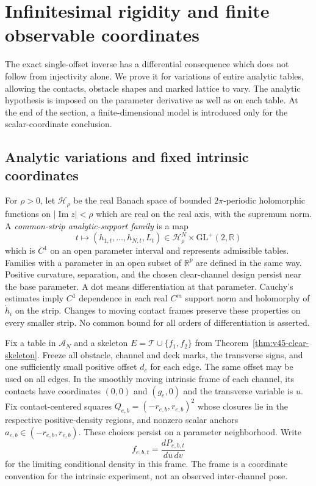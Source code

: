 \section{Infinitesimal rigidity and finite observable coordinates}
\label{sec:v48-differential}

The exact single-offset inverse has a differential consequence which does
not follow from injectivity alone.  We prove it for variations of entire
analytic tables, allowing the contacts, obstacle shapes and marked lattice
to vary.  The analytic hypothesis is imposed on the parameter derivative
as well as on each table.  At the end of the section, a finite-dimensional
model is introduced only for the scalar-coordinate conclusion.

\subsection{Analytic variations and fixed intrinsic coordinates}

For $\rho>0$, let $\mathcal H_\rho$ be the real Banach space of bounded
$2\pi$-periodic holomorphic functions on $|\operatorname{Im}z|<\rho$
which are real on the real axis, with the supremum norm.  A
\emph{common-strip analytic-support family} is a map
\begin{equation}\label{eq:v48-support-family}
 t\longmapsto (h_{1,t},\ldots,h_{N,t},L_t)
       \in\mathcal H_\rho^N\times\mathrm{GL}^+(2,\mathbb R)
\end{equation}
which is $C^1$ on an open parameter interval and represents admissible
tables.  Families with a parameter in an open subset of $\mathbb R^p$
are defined in the same way.  Positive curvature, separation, and the
chosen clear-channel design persist near the base parameter.  A dot
means differentiation at that parameter.  Cauchy's estimates imply
$C^1$ dependence in each real $C^m$ support norm and holomorphy of
$\dot h_i$ on the strip.  Changes to moving contact frames preserve
these properties on every smaller strip.  No common bound for all
orders of differentiation is asserted.

Fix a table in $\mathscr A_N$ and a skeleton
$E=\mathcal T\cup\{f_1,f_2\}$ from
Theorem~\ref{thm:v45-clear-skeleton}.  Freeze all obstacle, channel and
deck marks, the transverse signs, and one sufficiently small positive
offset $d_e$ for each edge.  The same offset may be used on all edges.
In the smoothly moving intrinsic frame of each channel, its contacts
have coordinates $(0,0)$ and $(g_e,0)$ and the transverse variable is
$u$.  Fix contact-centered squares $Q_{e,b}=(-r_{e,b},r_{e,b})^2$ whose
closures lie in the respective positive-density regions, and nonzero scalar
anchors $a_{e,b}\in(-r_{e,b},r_{e,b})$.  These choices persist on a
parameter neighborhood.  Write
\[
       f_{e,b,t}=\frac{dP_{e,b,t}}{du\,dv}
\]
for the limiting conditional density in this frame.  The frame is a
coordinate convention for the intrinsic experiment, not an observed
inter-channel pose.

